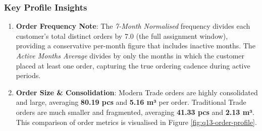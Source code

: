 \documentclass[11pt]{article}
\begin{document}
\begin{itemize}
\begin{table}[H]
\centering
{}
\caption{Customer Segment Order Profile Comparison}
\label{tab:q13-profile-comparison}
\end{table}

\subsubsection{Key Profile Insights}\label{key-profile-insights}
\begin{enumerate}
\item \textbf{Order Frequency Note}: The \textit{7-Month Normalised} frequency divides each customer's total distinct orders by 7.0 (the full assignment window), providing a conservative per-month figure that includes inactive months. The \textit{Active Months Average} divides by only the months in which the customer placed at least one order, capturing the true ordering cadence during active periods.

\item \textbf{Order Size \& Consolidation}: Modern Trade orders are highly consolidated and large, averaging \textbf{80.19 pcs} and \textbf{5.16 m³} per order. Traditional Trade orders are much smaller and fragmented, averaging \textbf{41.33 pcs} and \textbf{2.13 m³}. This comparison of order metrics is visualised in Figure \ref{fig:q13-order-profile}.


\end{enumerate}
\end{itemize}
\end{document}

